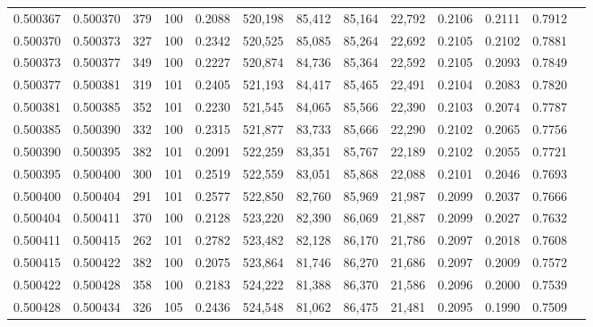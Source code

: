 \begin{tabular}{rrrrrrrrrrrrr}
0.500367 & 0.500370 &   379 & 100 &                                     0.2088 & 520,198 &  85,412 &  85,164 &  22,792 & 0.2106 & 0.2111 & 0.7912 \\
0.500370 & 0.500373 &   327 & 100 &                                     0.2342 & 520,525 &  85,085 &  85,264 &  22,692 & 0.2105 & 0.2102 & 0.7881 \\
0.500373 & 0.500377 &   349 & 100 &                                     0.2227 & 520,874 &  84,736 &  85,364 &  22,592 & 0.2105 & 0.2093 & 0.7849 \\
0.500377 & 0.500381 &   319 & 101 &                                     0.2405 & 521,193 &  84,417 &  85,465 &  22,491 & 0.2104 & 0.2083 & 0.7820 \\
0.500381 & 0.500385 &   352 & 101 &                                     0.2230 & 521,545 &  84,065 &  85,566 &  22,390 & 0.2103 & 0.2074 & 0.7787 \\
0.500385 & 0.500390 &   332 & 100 &                                     0.2315 & 521,877 &  83,733 &  85,666 &  22,290 & 0.2102 & 0.2065 & 0.7756 \\
0.500390 & 0.500395 &   382 & 101 &                                     0.2091 & 522,259 &  83,351 &  85,767 &  22,189 & 0.2102 & 0.2055 & 0.7721 \\
0.500395 & 0.500400 &   300 & 101 &                                     0.2519 & 522,559 &  83,051 &  85,868 &  22,088 & 0.2101 & 0.2046 & 0.7693 \\
0.500400 & 0.500404 &   291 & 101 &                                     0.2577 & 522,850 &  82,760 &  85,969 &  21,987 & 0.2099 & 0.2037 & 0.7666 \\
0.500404 & 0.500411 &   370 & 100 &                                     0.2128 & 523,220 &  82,390 &  86,069 &  21,887 & 0.2099 & 0.2027 & 0.7632 \\
0.500411 & 0.500415 &   262 & 101 &                                     0.2782 & 523,482 &  82,128 &  86,170 &  21,786 & 0.2097 & 0.2018 & 0.7608 \\
0.500415 & 0.500422 &   382 & 100 &                                     0.2075 & 523,864 &  81,746 &  86,270 &  21,686 & 0.2097 & 0.2009 & 0.7572 \\
0.500422 & 0.500428 &   358 & 100 &                                     0.2183 & 524,222 &  81,388 &  86,370 &  21,586 & 0.2096 & 0.2000 & 0.7539 \\
0.500428 & 0.500434 &   326 & 105 &                                     0.2436 & 524,548 &  81,062 &  86,475 &  21,481 & 0.2095 & 0.1990 & 0.7509 \\

\end{tabular}
